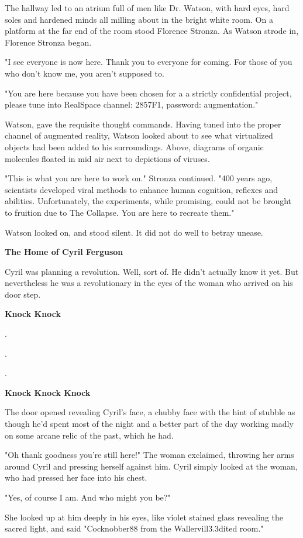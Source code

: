 \documentclass[12pt]{article}
\begin{document}
The hallway led to an atrium full of men like Dr. Watson, with hard eyes, hard soles and hardened minds all milling about in the bright white room. On a platform at the far end of the room stood Florence Stronza. As Watson strode in, Florence Stronza began.

"I see everyone is now here. Thank you to everyone for coming. For those of you who don't know me, you aren't supposed to.

"You are here because you have been chosen for a a strictly confidential project, please tune into RealSpace channel: 2857F1, password: augmentation."

Watson, gave the requisite thought commands. Having tuned into the proper channel of augmented reality, Watson looked about to see what virtualized objects had been added to his surroundings. Above, diagrams of organic molecules floated in mid air next to depictions of viruses.

"This is what you are here to work on." Stronza continued. "400 years ago, scientists developed viral methods to enhance human cognition, reflexes and abilities. Unfortunately, the experiments, while promising, could not be brought to fruition due to The Collapse. You are here to recreate them."

Watson looked on, and stood silent. It did not do well to betray unease.

\textbf{The Home of Cyril Ferguson}

Cyril was planning a revolution. Well, sort of. He didn't actually know it yet. But nevertheless he was a revolutionary in the eyes of the woman who arrived on his door step.

\textbf{Knock Knock}

.

.

.

\textbf{Knock Knock Knock}

The door opened revealing Cyril's face, a chubby face with the hint of stubble as though he'd spent most of the night and a better part of the day working madly on some arcane relic of the past, which he had. 

"Oh thank goodness you're still here!" The woman exclaimed, throwing her arms around Cyril and pressing herself against him. Cyril simply looked at the woman, who had pressed her face into his chest.

"Yes, of course I am. And who might you be?"

She looked up at him deeply in his eyes, like violet stained glass revealing the sacred light, and said "Cocknobber88 from the Wallervill3.3dited room."
\end{document}
